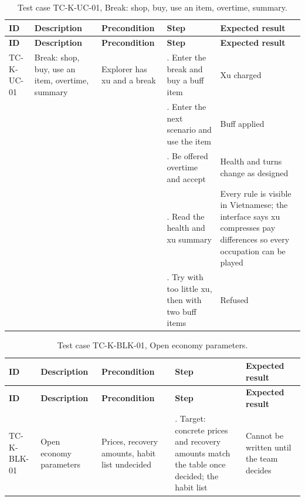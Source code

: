{\small
\begin{longtable}{|>{\raggedright\arraybackslash}p{}|>{\raggedright\arraybackslash}p{}|>{\raggedright\arraybackslash}p{}|>{\raggedright\arraybackslash}p{}|>{\raggedright\arraybackslash}p{}|}
\caption{Test case TC-K-UC-01, Break: shop, buy, use an item, overtime, summary.} \\
\hline
\textbf{ID} & \textbf{Description} & \textbf{Precondition} & \textbf{Step} & \textbf{Expected result} \\ \hline
\endfirsthead
\hline
\textbf{ID} & \textbf{Description} & \textbf{Precondition} & \textbf{Step} & \textbf{Expected result} \\ \hline
\endhead
TC-K-UC-01 & Break: shop, buy, use an item, overtime, summary & Explorer has xu and a break & 1. Enter the break and buy a buff item & Xu charged \\ \hline
 &  &  & 2. Enter the next scenario and use the item & Buff applied \\ \hline
 &  &  & 3. Be offered overtime and accept & Health and turns change as designed \\ \hline
 &  &  & 4. Read the health and xu summary & Every rule is visible in Vietnamese; the interface says xu compresses pay differences so every occupation can be played \\ \hline
 &  &  & 5. Try with too little xu, then with two buff items & Refused \\ \hline
\end{longtable}
}

{\small
\begin{longtable}{|>{\raggedright\arraybackslash}p{}|>{\raggedright\arraybackslash}p{}|>{\raggedright\arraybackslash}p{}|>{\raggedright\arraybackslash}p{}|>{\raggedright\arraybackslash}p{}|}
\caption{Test case TC-K-BLK-01, Open economy parameters.} \\
\hline
\textbf{ID} & \textbf{Description} & \textbf{Precondition} & \textbf{Step} & \textbf{Expected result} \\ \hline
\endfirsthead
\hline
\textbf{ID} & \textbf{Description} & \textbf{Precondition} & \textbf{Step} & \textbf{Expected result} \\ \hline
\endhead
TC-K-BLK-01 & Open economy parameters & Prices, recovery amounts, habit list undecided & 1. Target: concrete prices and recovery amounts match the table once decided; the habit list & Cannot be written until the team decides \\ \hline
\end{longtable}
}

